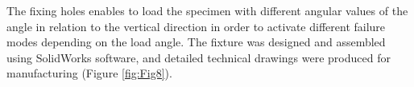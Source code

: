 \documentclass[3p,times,procedia]{elsarticle}
\begin{document}
The fixing holes enables to load the specimen with different angular values of the angle in relation to the vertical direction in order to activate different failure modes depending on the load angle. 
The fixture was designed and assembled using SolidWorks software, and detailed technical drawings were produced for manufacturing (Figure \ref{fig:Fig8}).



\end{document}
